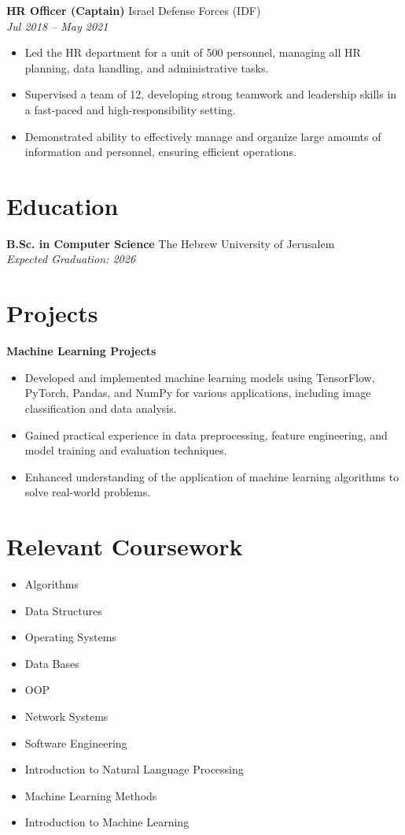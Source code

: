 \documentclass[a4paper,10pt]{article}
\begin{document}
\textbf{HR Officer (Captain)} \hfill Israel Defense Forces (IDF) \\
\textit{Jul 2018 -- May 2021}
\begin{itemize}[noitemsep,nolistsep]
    \item Led the HR department for a unit of 500 personnel, managing all HR planning, data handling, and administrative tasks.
    \item Supervised a team of 12, developing strong teamwork and leadership skills in a fast-paced and high-responsibility setting.
    \item Demonstrated ability to effectively manage and organize large amounts of information and personnel, ensuring efficient operations. 
\end{itemize}

\section*{Education}
\textbf{B.Sc. in Computer Science} \hfill The Hebrew University of Jerusalem \\
\textit{Expected Graduation: 2026} 

\section*{Projects}
\textbf{Machine Learning Projects} \\
\begin{itemize}[noitemsep,nolistsep]
    \item Developed and implemented machine learning models using TensorFlow, PyTorch, Pandas, and NumPy for various applications, including image classification and data analysis.
    \item Gained practical experience in data preprocessing, feature engineering, and model training and evaluation techniques. 
    \item Enhanced understanding of the application of machine learning algorithms to solve real-world problems.
\end{itemize}

\section*{Relevant Coursework}
\begin{itemize}[noitemsep,nolistsep]
    \item Algorithms
    \item Data Structures
    \item Operating Systems
    \item Data Bases
    \item OOP
    \item Network Systems
    \item Software Engineering
    \item Introduction to Natural Language Processing
    \item Machine Learning Methods
    \item Introduction to Machine Learning
\end{itemize}
\end{document}
